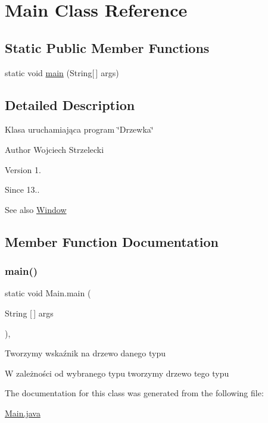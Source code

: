 \hypertarget{classMain}{}\section{Main Class Reference}
\label{classMain}
\subsection*{Static Public Member Functions}
\begin{DoxyCompactItemize}
\item 
static void \hyperlink{classMain_a8a5d0f827edddff706cc0e6740d0579a}{main} (String\mbox{[}$\,$\mbox{]} args)
\end{DoxyCompactItemize}


\subsection{Detailed Description}
Klasa uruchamiająca program \char`\"{}\+Drzewka\char`\"{} \begin{DoxyAuthor}{Author}
Wojciech Strzelecki 
\end{DoxyAuthor}
\begin{DoxyVersion}{Version}
1. 
\end{DoxyVersion}
\begin{DoxySince}{Since}
13.. 
\end{DoxySince}
\begin{DoxySeeAlso}{See also}
\hyperlink{classWindow}{Window} 
\end{DoxySeeAlso}


\subsection{Member Function Documentation}
\mbox{\label{classMain_a8a5d0f827edddff706cc0e6740d0579a}} 
\subsubsection{\texorpdfstring{main()}{main()}}
{\footnotesize\ttfamily static void Main.\+main (\begin{DoxyParamCaption}\item[{String \mbox{[}$\,$\mbox{]}}]{args }\end{DoxyParamCaption})\hspace{0.3cm}{\ttfamily [inline]}, {\ttfamily [static]}}

Tworzymy wskaźnik na drzewo danego typu

W zależności od wybranego typu tworzymy drzewo tego typu 

The documentation for this class was generated from the following file\+:\begin{DoxyCompactItemize}
\item 
\hyperlink{Main_8java}{Main.\+java}\end{DoxyCompactItemize}
